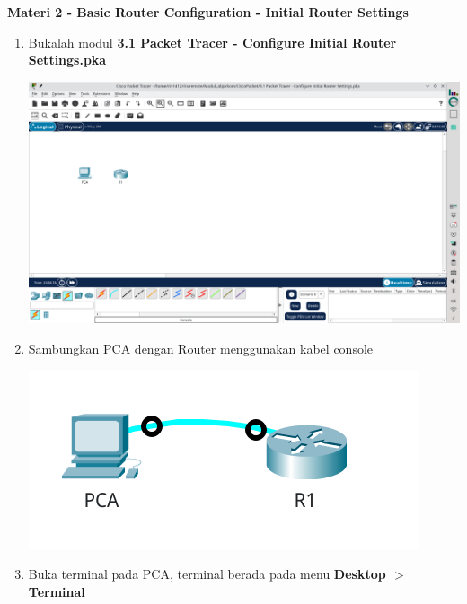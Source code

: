 \documentclass{article}
\begin{document}
    \begin{flushleft}
        \textbf{Materi 2 - Basic Router Configuration - Initial Router Settings}
        \newline

        \begin{enumerate}
            \item Bukalah modul \textbf{3.1 Packet Tracer - Configure Initial Router Settings.pka}
            
            \includegraphics[scale=0.25]{2-1.png}

            \item Sambungkan PCA dengan Router menggunakan kabel console
            
            \begin{center}
                \includegraphics[scale=0.3]{2-2.png}
            \end{center}

            \item Buka terminal pada PCA, terminal berada pada menu \textbf{Desktop $>$ Terminal}


\end{enumerate}
\end{flushleft}
\end{document}
